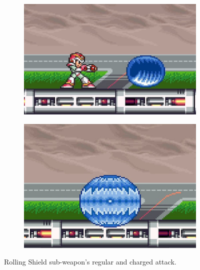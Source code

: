\begin{figure}[htp]
	\centering
	\begin{subfigure}{0.35\linewidth}
		\includegraphics[width=\linewidth]{figures/X1/weapons/Rolling_shield_1.jpg}	
	\end{subfigure}
	\begin{subfigure}{0.3\linewidth}
		\includegraphics[width=\linewidth]{figures/X1/weapons/Rolling_shield_2.jpg}	
	\end{subfigure}
	\caption{Rolling Shield sub-weapon's regular and charged attack.}
\end{figure}

